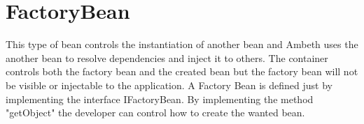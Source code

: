 \section{FactoryBean}
\label{feature:FactoryBean}
\ClearAPI
\TODO

This type of bean controls the instantiation of another bean and Ambeth uses the another bean to resolve dependencies and inject it to others. The container controls both the factory bean and the created bean but the factory bean will not be visible or injectable to the application. A Factory Bean is defined just by implementing the interface IFactoryBean. By implementing the method "getObject" the developer can control how to create the wanted bean.

